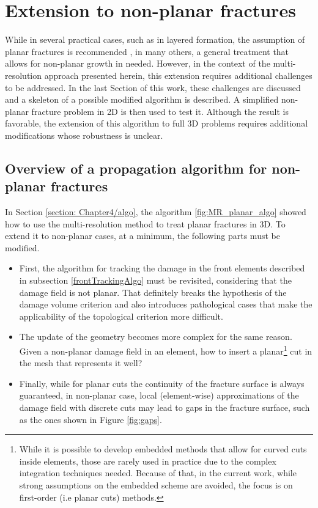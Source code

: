 \section{Extension to non-planar fractures}
\label{section: Chapter4/nonplanar}

While in several practical cases, such as in layered formation, the assumption of planar fractures is recommended \cite{mcclure2020planar}, in many others, a general treatment that allows for non-planar growth in needed. However, in the context of the multi-resolution approach presented herein, this extension requires additional challenges to be addressed. In the last Section of this work, these challenges are discussed and a skeleton of a possible modified algorithm is described. A simplified non-planar fracture problem in 2D is then used to test it. Although the result is favorable, the extension of this algorithm to full 3D problems requires additional modifications whose robustness is unclear. 

\subsection{Overview of a propagation algorithm for non-planar fractures}\label{basicNonplanarAlgo}

In Section \ref{section: Chapter4/algo}, the algorithm \ref{fig:MR_planar_algo} showed how to use the multi-resolution method to treat planar fractures in 3D. To extend it to non-planar cases, at a minimum, the following parts must be modified. 

\begin{itemize}
    \item First, the algorithm for tracking the damage in the front elements described in subsection \ref{frontTrackingAlgo} must be revisited, considering that the damage field is not planar. That definitely breaks the hypothesis of the damage volume criterion and also introduces pathological cases that make the applicability of the topological criterion more difficult.
    
    \item The update of the geometry becomes more complex for the same reason. Given a non-planar damage field in an element, how to insert a planar\footnote{While it is possible to develop embedded methods that allow for curved cuts inside elements, those are rarely used in practice due to the complex integration techniques needed. Because of that, in the current work, while strong assumptions on the embedded scheme are avoided, the focus is on first-order (i.e planar cuts) methods.} cut in the mesh that represents it well?
    
    \item Finally, while for planar cuts the continuity of the fracture surface is always guaranteed, in non-planar case, local (element-wise) approximations of the damage field with discrete cuts may lead to gaps in the fracture surface, such as the ones shown in Figure \ref{fig:gaps}.
\end{itemize}

